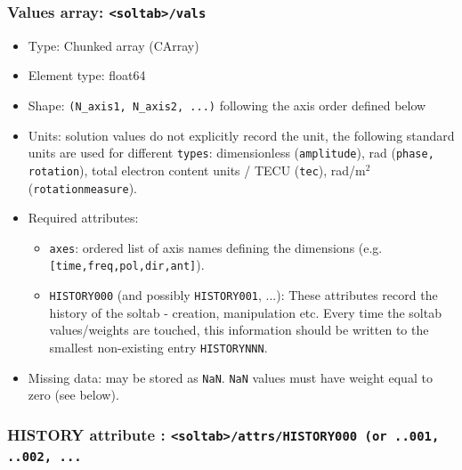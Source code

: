 \documentclass[a4paper,10pt,bibtotoc]{scrartcl}
\begin{document}
\subsubsection*{Values array: \texttt{<soltab>/vals}}
\begin{itemize}
  \item Type: Chunked array (CArray)
  \item Element type: float64 
  \item Shape: \texttt{(N\_axis1, N\_axis2, ...)} following the axis order defined below
  \item Units: solution values do not explicitly record the unit, the following standard units are used for different \texttt{types}: dimensionless (\texttt{amplitude}), rad (\texttt{phase, rotation}), total electron content units / TECU (\texttt{tec}), rad/m$^2$ (\texttt{rotationmeasure}).
  \item Required attributes:
  \begin{itemize}
    \item \texttt{axes}: ordered list of axis names defining the dimensions (e.g. \texttt{[time,freq,pol,dir,ant]}).
    \item \texttt{HISTORY000} (and possibly \texttt{HISTORY001}, ...): These attributes record the history of the soltab - creation, manipulation etc. Every time the soltab values/weights are touched, this information should be written to the smallest non-existing entry \texttt{HISTORYNNN}.
  \end{itemize}
  \item Missing data: may be stored as \texttt{NaN}. \texttt{NaN} values must have weight equal to zero (see below).
\end{itemize}
\subsubsection*{HISTORY attribute : \texttt{<soltab>/attrs/HISTORY000 (or ..001, ..002, ...}}
\end{document}
